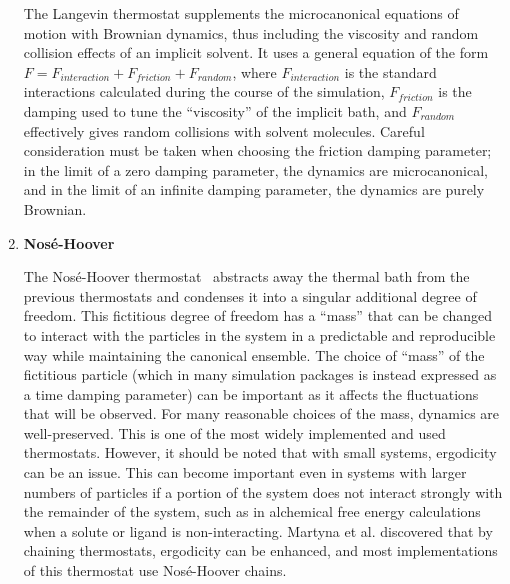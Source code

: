\documentclass[9pt,bestpractices]{livecoms}
\begin{document}
\begin{enumerate}[listparindent=\parindent]
        The Langevin\cite{schneider1978molecular} thermostat supplements the microcanonical equations of motion with Brownian dynamics, thus including the viscosity and random collision effects of an implicit solvent.
        It uses a general equation of the form $F = F_{interaction} + F_{friction} + F_{random}$, where $F_{interaction}$ is the standard interactions calculated during the course of the simulation, $F_{friction}$ is the damping used to tune the ``viscosity'' of the implicit bath, and $F_{random}$ effectively gives random collisions with solvent molecules.
        Careful consideration must be taken when choosing the friction damping parameter; in the limit of a zero damping parameter, the dynamics are microcanonical, and in the limit of an infinite damping parameter, the dynamics are purely Brownian.

    \item {\bf Nos\'{e}-Hoover}

        The Nos\'{e}-Hoover thermostat~\cite{thermostatAlgorithms2005} abstracts away the thermal bath from the previous thermostats and condenses it into a singular additional degree of freedom.
        This fictitious degree of freedom has a ``mass'' that can be changed to interact with the particles in the system in a predictable and reproducible way while maintaining the canonical ensemble.
        The choice of ``mass'' of the fictitious particle (which in many simulation packages is instead expressed as a time damping parameter) can be important as it affects the fluctuations that will be observed.
        For many reasonable choices of the mass, dynamics are well-preserved\cite{Basconi:2013:J.Chem.TheoryComput.}.
        This is one of the most widely implemented and used thermostats.
        However, it should be noted that with small systems, ergodicity can be an issue\cite{martyna1992nose,thermostatAlgorithms2005}. 
        This can become important even in systems with larger numbers of particles if a portion of the system does not interact strongly with the remainder of the system, such as in alchemical free energy calculations when a solute or ligand is non-interacting.
        Martyna et al. \cite{martyna1992nose} discovered that by chaining thermostats, ergodicity can be enhanced, and most implementations of this thermostat use Nos\'{e}-Hoover chains.
    
\end{enumerate}
\end{document}
